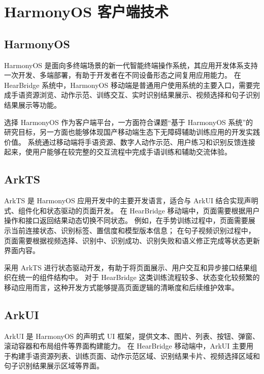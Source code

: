 
\section{HarmonyOS 客户端技术}

\subsection{HarmonyOS}

HarmonyOS 是面向多终端场景的新一代智能终端操作系统，其应用开发体系支持一次开发、多端部署，有助于开发者在不同设备形态之间复用应用能力\cite{harmonyos-multi-device-deployment}。
在 HearBridge 系统中，HarmonyOS 移动端是普通用户使用系统的主要入口，需要完成手语资源浏览、动作示范、训练交互、实时识别结果展示、视频选择和句子识别结果展示等功能。

选择 HarmonyOS 作为客户端平台，一方面符合课题“基于 HarmonyOS 系统”的研究目标，另一方面也能够体现国产移动端生态下无障碍辅助训练应用的开发实践价值。
系统通过移动端将手语资源、数字人动作示范、用户练习和识别反馈连接起来，使用户能够在较完整的交互流程中完成手语训练和辅助交流体验。

\subsection{ArkTS}

ArkTS 是 HarmonyOS 应用开发中的主要开发语言，适合与 ArkUI 结合实现声明式、组件化和状态驱动的页面开发。
在 HearBridge 移动端中，页面需要根据用户操作和接口返回结果动态切换不同状态。
例如，在手势训练过程中，页面需要展示当前连接状态、识别标签、置信度和模型版本信息；
在句子视频识别过程中，页面需要根据视频选择、识别中、识别成功、识别失败和语义修正完成等状态更新界面内容。

采用 ArkTS 进行状态驱动开发，有助于将页面展示、用户交互和异步接口结果组织在统一的组件结构中。
对于 HearBridge 这类训练流程较多、状态变化较频繁的移动应用而言，这种开发方式能够提高页面逻辑的清晰度和后续维护效率。

\subsection{ArkUI}

ArkUI 是 HarmonyOS 的声明式 UI 框架，提供文本、图片、列表、按钮、弹窗、滚动容器和布局组件等界面构建能力。
在 HearBridge 移动端中，ArkUI 主要用于构建手语资源列表、训练页面、动作示范区域、识别结果卡片、视频选择区域和句子识别结果展示区域等界面。

